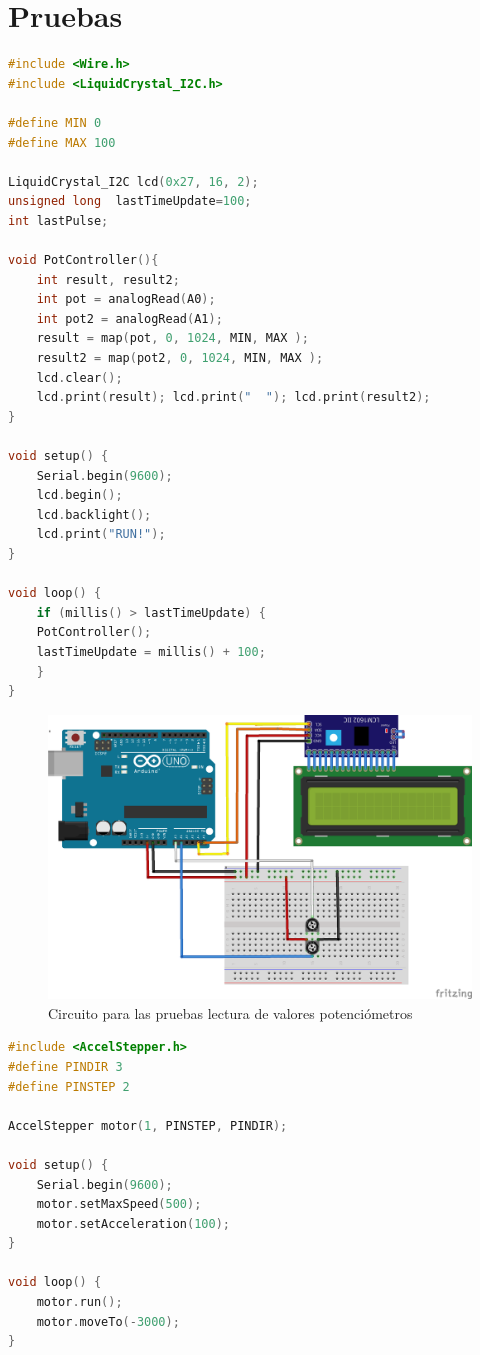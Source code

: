 \chapter{Pruebas}


\begin{lstlisting}[language=cpp, 
				   caption={Pruebas lectura de valores potenciómetros},
				   label={lst:potenciometro_test_code}]
#include <Wire.h>
#include <LiquidCrystal_I2C.h>

#define MIN 0
#define MAX 100

LiquidCrystal_I2C lcd(0x27, 16, 2);
unsigned long  lastTimeUpdate=100;
int lastPulse;

void PotController(){
	int result, result2;
	int pot = analogRead(A0);
	int pot2 = analogRead(A1);
	result = map(pot, 0, 1024, MIN, MAX );
	result2 = map(pot2, 0, 1024, MIN, MAX );	
	lcd.clear();
	lcd.print(result); lcd.print("  "); lcd.print(result2);
}

void setup() {
	Serial.begin(9600);
	lcd.begin();
	lcd.backlight();
	lcd.print("RUN!");
}

void loop() {
	if (millis() > lastTimeUpdate) {
	PotController();
	lastTimeUpdate = millis() + 100;
	}
}
\end{lstlisting}




\begin{figure}[h]
\centering
\includegraphics[width=0.9\linewidth]{../images/test_potenciometros}
\caption{Circuito para las pruebas lectura de valores potenciómetros}
\label{fig:test_potenciometros}
\end{figure}


\begin{lstlisting}[language=cpp,
				   caption={Prueba mover motor paso a paso},
				   label={lst:motor_test_code}]
#include <AccelStepper.h>
#define PINDIR 3
#define PINSTEP 2

AccelStepper motor(1, PINSTEP, PINDIR);

void setup() {
	Serial.begin(9600);
	motor.setMaxSpeed(500);
	motor.setAcceleration(100);
}

void loop() {
	motor.run();
	motor.moveTo(-3000);
}


\end{lstlisting}

